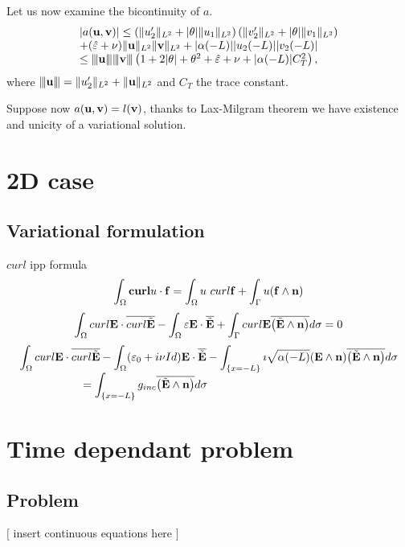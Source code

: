 \documentclass{article}
\newcommand{\be}{\begin{equation}}
\newcommand{\ee}{\end{equation}}
\newcommand{\E}{{\bf E}}
\newcommand{\n}{{\bf n}}
\newcommand{\f}{{\bf f}}
\newcommand{\ubf}{{\bf u}}
\newcommand{\vbf}{{\bf v}}
\newcommand{\curl}{{\bf curl}}
\newcommand{\eps}{{\bf \varepsilon}}
\newcommand{\heps}{{\hat{\eps}}}
\newcommand{\vertiii}[1]{{\left\vert\kern-0.25ex\left\vert\kern-0.25ex\left\vert #1 
    \right\vert\kern-0.25ex\right\vert\kern-0.25ex\right\vert}}
\begin{document}
Let us now examine the bicontinuity of $a$.
\be 
\begin{array}{l}
| a(\ubf, \vbf) |  \leq \left( \| u_2' \|_{L^2} + |\theta | \|u_1\|_{L^2}\right) \left( \| v_2' \|_{L^2} + |\theta | \|v_1\|_{L^2} \right)\\
+ (\heps+\nu) \| \ubf \|_{L^2} \| \vbf \|_{L^2} + |\alpha(-L) | |u_2(-L)| |v_2(-L)|
\\
\leq \vertiii{\ubf} \vertiii{\vbf} \left( 1 + 2|\theta| + \theta^2 + \heps + \nu + |\alpha(-L) | C_T^2 \right),
\end{array}
\ee  
where $\vertiii{\ubf} = \|u_2'\|_{L^2} + \|\ubf\|_{L^2}$ and $C_T$ the trace constant.

Suppose now $a(\ubf,\vbf) = l(\vbf)$, thanks to Lax-Milgram theorem we have existence and unicity of a variational solution.

\section{2D case}


\subsection{Variational formulation}
$curl$ ipp formula
\be
\int_\Omega \curl u \cdot \f = \int_\Omega u\ curl \f + \int_\Gamma u (\f \wedge \n)
\ee
\be
\int_\Omega curl \E \cdot \overline{curl \tilde \E} - \int_\Omega \eps \E \cdot \overline{\tilde \E} + \int _\Gamma curl \E \overline{\left( \tilde \E\wedge \n \right)} d\sigma = 0
\ee
\be
\begin{array}{l}
\displaystyle \int_\Omega curl \E \cdot \overline{curl \tilde \E} - \int_\Omega (\eps_0+i\nu Id) \E \cdot \overline{\tilde \E} - \int _{\{x=-L\}} \imath \sqrt{\alpha(-L)}(\E\wedge \n) \overline{\left( \tilde \E\wedge \n \right)} d\sigma 
\\ \displaystyle \phantom{ fffffffff}= \int_{\{x=-L\}} g_{inc}  \overline{\left( \tilde \E\wedge \n \right)} d\sigma
\end{array}\ee

\section{Time dependant problem}
\subsection{Problem}
$[$ insert continuous equations here $]$
\end{document}
